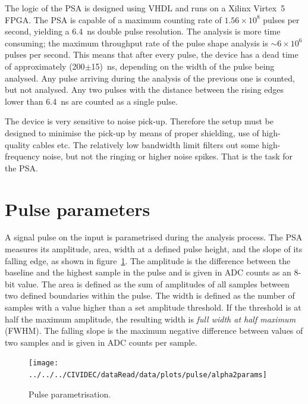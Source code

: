 The logic of the PSA is designed using VHDL and runs on a Xilinx Virtex~5 FPGA. The PSA is capable of a maximum counting rate of $1.56\times10^8$ pulses per second, yielding a 6.4~ns double pulse resolution. The analysis is more time consuming; the maximum throughput rate of the pulse shape analysis is $\sim6\times10^6$ pulses per second. This means that after every pulse, the device has a dead time of approximately (200$\pm$15)~ns, depending on the width of the pulse being analysed. Any pulse arriving during the analysis of the previous one is counted, but not analysed. Any two pulses with the distance between the rising edges lower than 6.4~ns are counted as a single pulse.

The device is very sensitive to noise pick-up. Therefore the setup must be designed to minimise the pick-up by means of proper shielding, use of high-quality cables etc. The relatively low bandwidth limit filters out some high-frequency noise, but not the ringing or higher noise spikes. That is the task for the PSA.


\section{Pulse parameters}
\label{sec:pulsepar}
A signal pulse on the input is parametrised during the analysis process. The PSA measures its amplitude, area, width at a defined pulse height, and the slope of its falling edge, as shown in figure~\ref{fig:params}. The amplitude is the difference between the baseline and the highest sample in the pulse and is given in ADC counts as an 8-bit value. The area is defined as the sum of amplitudes of all samples between two defined boundaries within the pulse. The width is defined as the number of samples with a value higher than a set amplitude threshold. If the threshold is at half the maximum amplitude, the resulting width is \emph{full width at half maximum} (FWHM). The falling slope is the maximum negative difference between values of two samples and is given in ADC counts per sample. 



\begin{figure}[!t]
\centering
\texttt{[image: ../../../CIVIDEC/dataRead/data/plots/pulse/alpha2params]}
\caption{Pulse parametrisation.}
\label{fig:params}
\end{figure}

